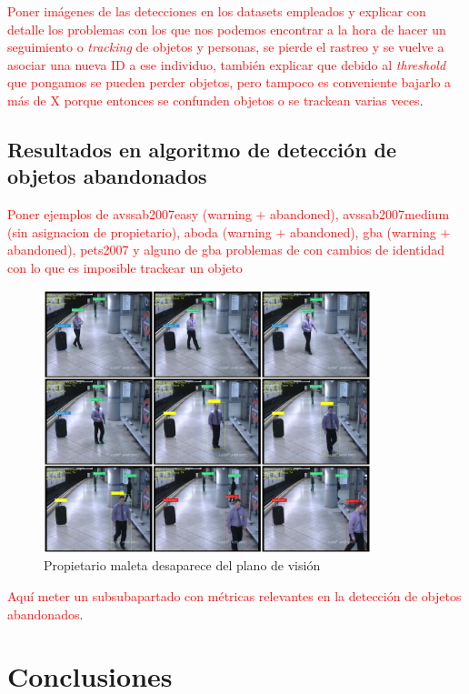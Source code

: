 \textcolor{red}{Poner imágenes de las detecciones en los datasets empleados y explicar con detalle los problemas con los que nos podemos encontrar a la hora de hacer un seguimiento o \textit{tracking} de objetos y personas, se pierde el rastreo y se vuelve a asociar una nueva ID a ese individuo, también explicar que debido al \textit{threshold} que pongamos se pueden perder objetos, pero tampoco es conveniente bajarlo a más de X porque entonces se confunden objetos o se trackean varias veces}.

\newpage

\subsection{Resultados en algoritmo de detección de objetos abandonados}
\label{subsec:resultados-abandon-algorithm}

\textcolor{red}{Poner ejemplos de avssab2007easy (warning + abandoned), avssab2007medium (sin asignacion de propietario), aboda (warning + abandoned), gba (warning + abandoned), pets2007 y alguno de gba problemas de con cambios de identidad con lo que es imposible trackear un objeto}

\begin{figure}[ht]
\centering
\includegraphics[width=0.85\textwidth]{img/chapters/resultados/abandono/abandoned-avssab2007-example2.png}
\caption{\label{fig:propietario-desaparece-plano}Propietario maleta desaparece del plano de visión}
\end{figure}

\textcolor{red}{Aquí meter un subsubapartado con métricas relevantes en la detección de objetos abandonados}.

\newpage

\section{Conclusiones}
\label{sec:conclu-resultados}

